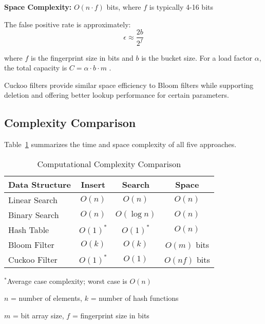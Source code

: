\textbf{Space Complexity:} $O(n \cdot f)$ bits, where $f$ is typically 4-16 bits

The false positive rate is approximately:
\begin{equation}
\epsilon \approx \frac{2b}{2^f}
\end{equation}

where $f$ is the fingerprint size in bits and $b$ is the bucket size. For a load factor $\alpha$, the total capacity is $C = \alpha \cdot b \cdot m$ \cite{fan2014cuckoo}.

Cuckoo filters provide similar space efficiency to Bloom filters while supporting deletion and offering better lookup performance for certain parameters.

\subsection{Complexity Comparison}

Table~\ref{tab:complexity} summarizes the time and space complexity of all five approaches.

\begin{table}[h]
\centering
\caption{Computational Complexity Comparison}
\label{tab:complexity}
\begin{tabular}{@{}lccc@{}}
\toprule
\textbf{Data Structure} & \textbf{Insert} & \textbf{Search} & \textbf{Space} \\
\midrule
Linear Search & $O(n)$ & $O(n)$ & $O(n)$ \\
Binary Search & $O(n)$ & $O(\log n)$ & $O(n)$ \\
Hash Table & $O(1)^*$ & $O(1)^*$ & $O(n)$ \\
Bloom Filter & $O(k)$ & $O(k)$ & $O(m)$ bits \\
Cuckoo Filter & $O(1)^*$ & $O(1)$ & $O(nf)$ bits \\
\bottomrule
\end{tabular}
\begin{tablenotes}
\small
\item $^*$Average case complexity; worst case is $O(n)$
\item $n$ = number of elements, $k$ = number of hash functions
\item $m$ = bit array size, $f$ = fingerprint size in bits
\end{tablenotes}
\end{table}

